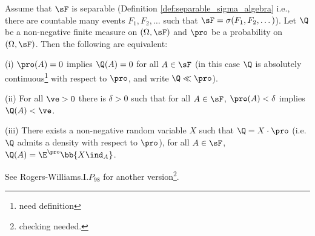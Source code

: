 \begin{theorem}\label{thm:radon_nikodym_discrete}
Assume that $\sF$ is separable (Definition \ref{def:separable_sigma_algebra} i.e., there are countable many events $F_1,F_2,\dots$ such that $\sF = \sigma(F_1,F_2,\dots)$). Let $\Q$ be a non-negative finite measure on $(\Omega,\sF)$ and $\pro$ be a probability on $(\Omega,\sF)$. Then the following are equivalent:
\ben
\item [(i)] $\pro(A) = 0$ implies $\Q(A) = 0$ for all $A \in \sF$ (in this case $\Q$ is absolutely continuous\footnote{need definition} with respect to $\pro$, and write $\Q \ll \pro$).
\item [(ii)] For all $\ve > 0$ there is $\delta > 0$ such that for all $A \in \sF$, $\pro(A) < \delta$ implies $\Q(A) < \ve$.
\item [(iii)] There exists a non-negative random variable $X$ such that $\Q = X \cdot \pro$ (i.e. $\Q$ admits a density with respect to $\pro$), for all $A\in \sF$, $\Q(A) = \E^\pro\bb{X\ind_A}$.
\een
\end{theorem}

\begin{remark}
See Rogers-Williams\cite{Rogers_1994}.I.$P_{98}$ for another version\footnote{checking needed.}.
\end{remark}

